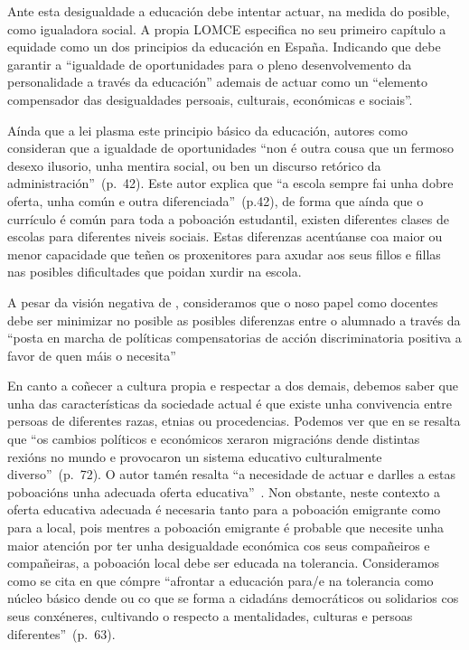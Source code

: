 Ante esta desigualdade a educación debe intentar actuar, na medida do posible, como igualadora social. A propia LOMCE especifica no seu primeiro capítulo a equidade como un dos principios da educación en España. Indicando que debe garantir a ``igualdade de oportunidades para o pleno desenvolvemento da personalidade a través da educación'' ademais de actuar como un ``elemento compensador das desigualdades persoais, culturais, económicas e sociais''.

Aínda que a lei plasma este principio básico da educación, autores como  consideran que a igualdade de oportunidades ``non é outra cousa que un fermoso desexo ilusorio, unha mentira social, ou ben un discurso retórico da administración''~(p.~42). Este autor explica que ``a escola sempre fai unha dobre oferta, unha común e outra diferenciada''~(p.42), de forma que aínda que o currículo é común para toda a poboación estudantil, existen diferentes clases de escolas para diferentes niveis sociais. Estas diferenzas acentúanse coa maior ou menor capacidade que teñen os proxenitores para axudar aos seus fillos e fillas nas posibles dificultades que poidan xurdir na escola.

A pesar da visión negativa de \citeauthor{funcionessocieles}, consideramos que o noso papel como docentes debe ser minimizar no posible as posibles diferenzas entre o alumnado a través da ``posta en marcha de políticas compensatorias de acción discriminatoria positiva a favor de quen máis o necesita''~\cite[p.~17]{sacristan2000educacion}

En canto a coñecer a cultura propia e respectar a dos demais, debemos saber que unha das características da sociedade actual é que existe unha convivencia entre persoas de diferentes razas, etnias ou procedencias. Podemos ver que en  se resalta que ``os cambios políticos e económicos xeraron migracións dende distintas rexións no mundo e provocaron un sistema educativo culturalmente diverso''~(p.~72). O autor tamén resalta ``a necesidade de actuar e darlles a estas poboacións unha adecuada oferta educativa''~\cite[p.~72]{rivera2014practica}. Non obstante, neste contexto a oferta educativa adecuada é necesaria tanto para a poboación emigrante como para a local, pois mentres a poboación emigrante é probable que necesite unha maior atención por ter unha desigualdade económica cos seus compañeiros e compañeiras, a poboación local debe ser educada na tolerancia. Consideramos como se cita en   que cómpre ``afrontar a educación para/e na tolerancia como núcleo básico dende ou co que se forma a cidadáns democráticos ou solidarios cos seus conxéneres, cultivando o respecto a mentalidades, culturas e persoas diferentes''~(p.~63).

